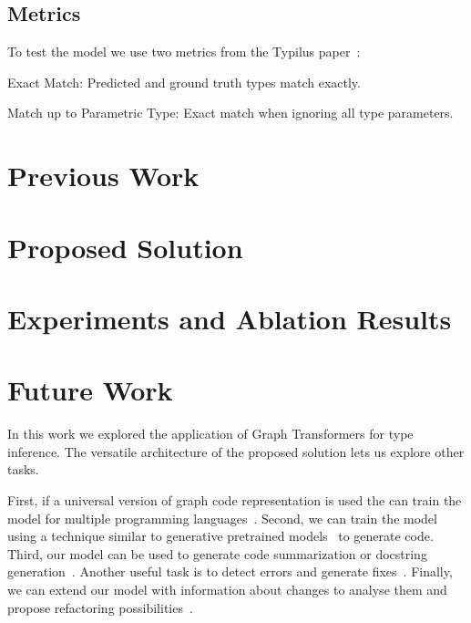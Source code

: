 \documentclass[conference]{IEEEtran}
\begin{document}
\subsection{Metrics}\label{subsec:metrics}

To test the model we use two metrics from the Typilus paper~\cite{allamanis2020typilus}:

\begin{description}
    \item{Exact Match: Predicted and ground truth types match exactly.}
    \item{Match up to Parametric Type: Exact match when ignoring all type parameters.}
\end{description}

\section{Previous Work}\label{sec:previous-work}


\section{Proposed Solution}\label{sec:proposed-solution}


\section{Experiments and Ablation Results}\label{sec:experiment-results-and-ablation}


\section{Future Work}\label{sec:future-work}

In this work we explored the application of Graph Transformers for type inference.
The versatile architecture of the proposed solution lets us explore other tasks.

First, if a universal version of graph code representation is used the can train the model for multiple programming languages~\cite{wang_unified_2022}.
Second, we can train the model using a technique similar to generative pretrained models~\cite{radford_language_2019,brown_language_2020} to generate code.
Third, our model can be used to generate code summarization or docstring generation~\cite{barone_parallel_2017,liu_haconvgnn_2021}.
Another useful task is to detect errors and generate fixes~\cite{bhatia_automated_2016,fujimoto_addressing_2018,marginean_sapfix_2019}.
Finally, we can extend our model with information about changes to analyse them and propose refactoring possibilities~\cite{cabrera_lozoya_commit2vec_2021}.
\end{document}

